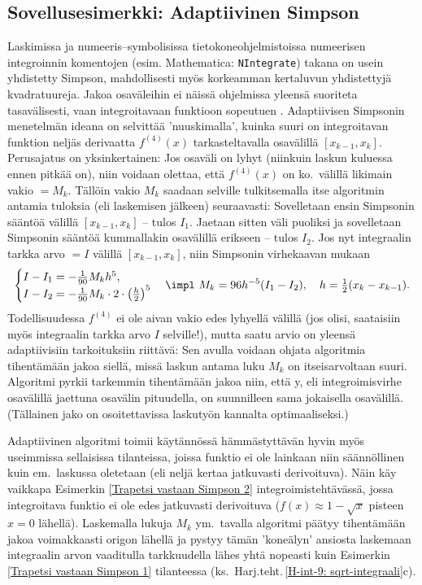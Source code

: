 \subsection*{Sovellusesimerkki: Adaptiivinen Simpson}

Laskimissa ja numeeris--symbolisissa tietokoneohjelmistoissa numeerisen integroinnin komentojen
(esim. Mathematica: \verb|NIntegrate|) takana on usein yhdistetty Simpson, mahdollisesti myös
korkeamman kertaluvun yhdistettyjä kvadratuureja. Jakoa osaväleihin ei näissä ohjelmissa
yleensä suoriteta tasavälisesti, vaan integroitavaan funktioon sopeutuen . 
Adaptiivisen Simpsonin menetelmän ideana on selvittää 'nuuskimalla', kuinka suuri on 
integroitavan funktion neljäs derivaatta $f^{(4)}(x)$ tarkasteltavalla osavälillä 
$[x_{k-1},x_k]$. Perusajatus on yksinkertainen: Jos osaväli on lyhyt (niinkuin laskun kuluessa
ennen pitkää on), niin voidaan olettaa, että $f^{(4)}(x)$ on ko.\ välillä likimain vakio $=M_k$.
Tällöin vakio $M_k$ saadaan selville tulkitsemalla itse algoritmin antamia tuloksia 
%
 (eli laskemisen jälkeen) seuraavasti: Sovelletaan ensin Simpsonin sääntöä
välillä $[x_{k-1},x_k]$ -- tulos $I_1$. Jaetaan sitten väli puoliksi ja sovelletaan Simpsonin
sääntöä kummallakin osavälillä erikseen -- tulos $I_2$. Jos nyt integraalin tarkka arvo $=I$ 
välillä $[x_{k-1},x_k]$, niin Simpsonin virhekaavan mukaan
\[
\begin{cases} 
 I-I_1=-\frac{1}{90}M_kh^5, \\ 
 I-I_2=-\frac{1}{90}M_k\cdot 2\cdot\left(\frac{h}{2}\right)^5
\end{cases}
\impl\ M_k=96h^{-5}(I_1-I_2), \quad h=\tfrac{1}{2}(x_k-x_{k-1}).
\]
Todellisuudessa $f^{(4)}$ ei ole aivan vakio edes lyhyellä välillä (jos olisi, saataisiin myös
integraalin tarkka arvo $I$ selville!), mutta saatu arvio on yleensä adaptiivisiin 
tarkoituksiin riittävä: Sen avulla voidaan ohjata algoritmia tihentämään jakoa siellä, missä 
laskun antama luku $M_k$ on itseisarvoltaan suuri. Algoritmi pyrkii tarkemmin tihentämään jakoa
niin, että y, eli integroimisvirhe osavälillä jaettuna osavälin 
pituudella, on suunnilleen sama jokaisella osavälillä. (Tällainen jako on osoitettavissa 
laskutyön kannalta optimaaliseksi.) 

Adaptiivinen algoritmi toimii käytännössä hämmästyttävän hyvin myös useimmissa sellaisissa
tilanteissa, joissa funktio ei ole lainkaan niin säännöllinen kuin em.\ laskussa oletetaan
(eli neljä kertaa jatkuvasti derivoituva). Näin käy vaikkapa Esimerkin 
\ref{Trapetsi vastaan Simpson 2} integroimistehtävässä, jossa integroitava funktio ei ole
edes jatkuvasti derivoituva ($f(x) \approx 1-\sqrt{x}$ pisteen $x=0$ lähellä). Laskemalla
lukuja $M_k$ ym.\ tavalla algoritmi päätyy tihentämään jakoa voimakkaasti origon lähellä
ja pystyy tämän 'koneälyn' ansiosta laskemaan integraalin arvon vaaditulla tarkkuudella lähes
yhtä nopeasti kuin Esimerkin \ref{Trapetsi vastaan Simpson 1} tilanteessa 
(ks.\ Harj.teht.\,\ref{H-int-9: sqrt-integraali}c).

